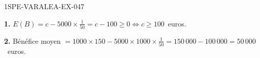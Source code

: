 \begin{corrige}{1SPE-VARALEA-EX-047}

\textbf{1.} $E(B) = c - 5000 \times \frac{1}{50} = c - 100 \geq 0 \Leftrightarrow c \geq 100$~euros.

\medskip
\textbf{2.} Bénéfice moyen $= 1000 \times 150 - 5000 \times 1000 \times \frac{1}{50} = 150\,000 - 100\,000 = 50\,000$~euros.

\end{corrige}
